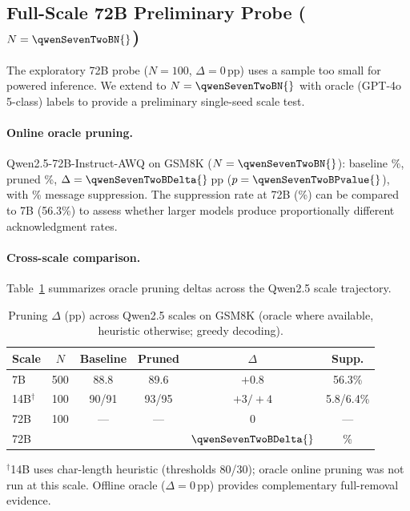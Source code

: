 \subsection{Full-Scale 72B Preliminary Probe ($N = \qwenSevenTwoBN{}$)}
\label{app:scaling_72b}

The exploratory 72B probe ($N = 100$, $\Delta = 0$\,pp) uses a sample too small for powered inference. We extend to $N = \qwenSevenTwoBN{}$ with oracle (GPT-4o 5-class) labels to provide a preliminary single-seed scale test.

\paragraph{Online oracle pruning.} Qwen2.5-72B-Instruct-AWQ on GSM8K ($N = \qwenSevenTwoBN{}$): baseline \qwenSevenTwoBBaseline{}\%, pruned \qwenSevenTwoBPruned{}\%, $\Delta = \qwenSevenTwoBDelta{}$\,pp ($p = \qwenSevenTwoBPvalue{}$), with \qwenSevenTwoBSupp{}\% message suppression. The suppression rate at 72B (\qwenSevenTwoBSupp{}\%) can be compared to 7B (56.3\%) to assess whether larger models produce proportionally different acknowledgment rates.

\paragraph{Cross-scale comparison.} Table~\ref{app:tab:scale_summary} summarizes oracle pruning deltas across the Qwen2.5 scale trajectory.

\begin{table}[ht]
\centering
\caption{Pruning $\Delta$ (pp) across Qwen2.5 scales on GSM8K (oracle where available, heuristic otherwise; greedy decoding).}
\label{app:tab:scale_summary}
\small
\begin{tabular}{lccccc}
\toprule
\textbf{Scale} & $N$ & \textbf{Baseline} & \textbf{Pruned} & $\Delta$ & \textbf{Supp.} \\
\midrule
7B  & 500 & 88.8 & 89.6 & $+0.8$ & 56.3\% \\
14B$^\dagger$ & 100 & 90/91 & 93/95 & $+3/+4$ & 5.8/6.4\% \\
72B & 100 & --- & --- & $0$ & --- \\
72B & \qwenSevenTwoBN{} & \qwenSevenTwoBBaseline{} & \qwenSevenTwoBPruned{} & $\qwenSevenTwoBDelta{}$ & \qwenSevenTwoBSupp{}\% \\
\bottomrule
\end{tabular}

{\footnotesize $^\dagger$14B uses char-length heuristic (thresholds 80/30); oracle online pruning was not run at this scale. Offline oracle ($\Delta = 0$\,pp) provides complementary full-removal evidence.}
\end{table}

